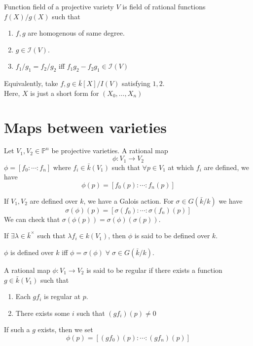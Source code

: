\documentclass[oneside, 12pt]{scrbook}
\newcommand{\I}{\mathcal{I}}
\newcommand{\PP}{\mathbb{P}}
\theoremstyle{theorem}
\begin{document}
\begin{remark}
Function field of a projective variety $V$ is field of rational functions $f(X)/g(X)$ such that 
\begin{enumerate}
\item $f,g$ are homogenous of same degree. 
\item $g \in \I(V)$.
\item $f_{1}/g_{1} = f_{2}/g_{2}$ iff $f_{1}g_{2} - f_{2}g_{1} \in \I(V)$ 
\end{enumerate}
Equivalently, take $f,g \in \bar{k}[X]/I(V)$ satisfying $1,2$.\\

\textcolor{BrickRed}{Here, $X$ is just a short form for $(X_{0}, \hdots , X_{n})$}
\end{remark}

\section{Maps between varieties}

\begin{definition}
Let $V_{1},V_{2}\in \PP^n$ be projective varieties. A rational map $$\phi : V_{1} \rightarrow V_{2}$$ $\phi = [f_{0} : \cdots : f_{n}]$ where $f_{i} \in \bar{k}(V_{1})$ such that $\forall p \in V_{1}$ at which $f_{i}$ are defined, we have $$\phi(p)= [f_{0}(p): \cdots : f_{n}(p)]$$
\end{definition}

If $V_{1},V_{2}$ are defined over $k$, we have a Galois action. For $\sigma \in G(\bar{k}/k)$ we have $$\sigma(\phi)(p) = [\sigma(f_{0}): \cdots : \sigma(f_{n})(p)]$$
We can check that $\sigma(\phi(p)) = \sigma(\phi)(\sigma(p))$.\\

\begin{definition}
If $\exists \lambda \in \bar{k}^{\times}$ such that $\lambda f_{i} \in k(V_{1})$, then $\phi$ is said to be defined over $k$.
\end{definition}

\begin{proposition}
$\phi$ is defined over $k$ iff $\phi =\sigma(\phi) \; \forall \; \sigma \in G(\bar{k}/k)$.
\end{proposition}

\begin{definition}
A rational map $\phi: V_{1} \rightarrow V_{2}$ is said to be regular if there exists a function $g \in \bar{k}(V_{1})$ such that 
\begin{enumerate}
\item Each $gf_{i}$ is regular at $p$.
\item There exists some $i$ such that $(gf_{i})(p) \neq 0$
\end{enumerate}
If such a $g$ exists, then we set $$\phi(p) = [(gf_{0})(p) : \cdots : (gf_{n})(p)]$$
\end{definition}
\end{document}
